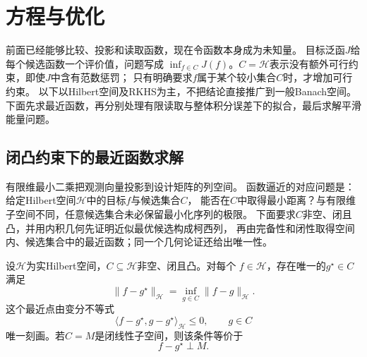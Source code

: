\section{方程与优化}
\label{sec:functional-optimization-regularization}

前面已经能够比较、投影和读取函数，现在令函数本身成为未知量。
目标泛函$J$给每个候选函数一个评价值，问题写成
$\inf_{f\in C}J(f)$。$C=\mathcal H$表示没有额外可行约束，即使$J$中含有范数惩罚；
只有明确要求$f$属于某个较小集合$C$时，才增加可行约束。
以下以Hilbert空间及RKHS为主，不把结论直接推广到一般Banach空间。
下面先求最近函数，再分别处理有限读取与整体积分误差下的拟合，最后求解平滑能量问题。

\subsection{闭凸约束下的最近函数求解}
\label{sec:functional-nearest-function}

有限维最小二乘把观测向量投影到设计矩阵的列空间。
函数逼近的对应问题是：给定Hilbert空间$\mathcal H$中的目标$f$与候选集合$C$，
能否在$C$中取得最小距离？与有限维子空间不同，任意候选集合未必保留最小化序列的极限。
下面要求$C$非空、闭且凸，并用内积几何先证明近似最优候选构成柯西列，
再由完备性和闭性取得空间内、候选集合中的最近函数；同一个几何论证还给出唯一性。

\begin{theorem}[Hilbert空间投影定理]
\label{thm:functional-hilbert-projection}
设$\mathcal{H}$为实Hilbert空间，$C\subseteq\mathcal{H}$非空、闭且凸。对每个
$f\in\mathcal{H}$，存在唯一的$g^\star\in C$满足
\[
  \lVert f-g^\star\rVert_{\mathcal{H}}
  =\inf_{g\in C}\lVert f-g\rVert_{\mathcal{H}}.
\]
这个最近点由变分不等式
\begin{equation}
  \langle f-g^\star,g-g^\star\rangle_{\mathcal{H}}
  \leq0,\qquad g\in C
  \label{eq:functional-convex-projection-characterization}
\end{equation}
唯一刻画。若$C=M$是闭线性子空间，则该条件等价于
\begin{equation}
  f-g^\star\perp M.
  \label{eq:functional-subspace-projection-orthogonality}
\end{equation}
\end{theorem}

